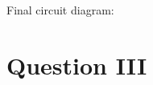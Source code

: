 \documentclass[12pt, a4paper]{article}
\begin{document}
	Final circuit diagram:
	\begin{center}
	\end{center}

	\section*{Question III}
\end{document}
